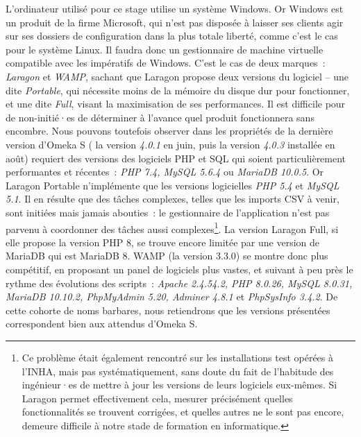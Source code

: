 \documentclass[a4paper,12pt, twoside]{book}
\begin{document}
L’ordinateur utilisé pour ce stage utilise un système Windows. Or Windows est un produit de la firme Microsoft, qui n’est pas disposée à laisser ses clients agir sur ses dossiers de configuration dans la plus totale liberté, comme c’est le cas pour le système Linux. Il faudra donc un gestionnaire de machine virtuelle compatible avec les impératifs de Windows. C’est le cas de deux marques~: \textit{Laragon} et \textit{WAMP}, sachant que Laragon propose deux versions du logiciel – une dite \textit{Portable}, qui nécessite moins de la mémoire du disque dur pour fonctionner, et une dite \textit{Full}, visant la maximisation de ses performances. Il est difficile pour de non-initié·es de déterminer à l’avance quel produit fonctionnera sans encombre. Nous pouvons toutefois observer dans les propriétés de la dernière version d’Omeka S ( la version \textit{4.0.1} en juin, puis la version \textit{4.0.3} installée en août) requiert des versions des logiciels PHP et SQL qui soient particulièrement performantes et récentes~: \textit{PHP 7.4, MySQL 5.6.4} ou \textit{MariaDB 10.0.5}. Or Laragon Portable n’implémente que les versions logicielles \textit{PHP 5.4} et \textit{MySQL 5.1}. Il en résulte que des tâches complexes, telles que les imports CSV à venir, sont initiées mais jamais abouties~: le gestionnaire de l’application n’est pas parvenu à coordonner des tâches aussi complexes\footnote{Ce problème était également rencontré sur les installations test opérées à l’INHA, mais pas systématiquement, sans doute du fait de l’habitude des ingénieur·es de mettre à jour les versions de leurs logiciels eux-mêmes. Si Laragon permet effectivement cela, mesurer précisément quelles fonctionnalités se trouvent corrigées, et quelles autres ne le sont pas encore, demeure difficile à notre stade de formation en informatique.}. La version Laragon Full, si elle propose la version PHP 8, se trouve encore limitée par une version de MariaDB qui est MariaDB 8. WAMP (la version 3.3.0) se montre donc plus compétitif, en proposant un panel de logiciels plus vastes, et suivant à peu près le rythme des évolutions des scripts~: \textit{Apache 2.4.54.2, PHP 8.0.26, MySQL 8.0.31, MariaDB 10.10.2, PhpMyAdmin 5.20, Adminer 4.8.1} et \textit{PhpSysInfo 3.4.2}. De cette cohorte de noms barbares, nous retiendrons que les versions présentées correspondent bien aux attendus d’Omeka S.
\end{document}
